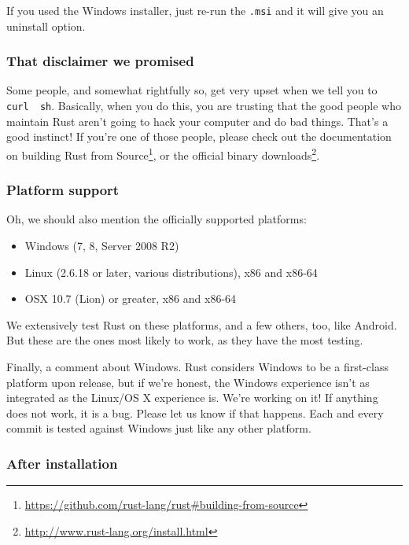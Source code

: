 \documentclass[a4paper,]{book}
\renewcommand{\href}[2]{#2\footnote{\url{#1}}}
\providecommand{\tightlist}{%
  \setlength{\itemsep}{0pt}\setlength{\parskip}{0pt}}
\begin{document}
If you used the Windows installer, just re-run the \texttt{.msi} and it
will give you an uninstall option.

\subsubsection{That disclaimer we
promised}\label{that-disclaimer-we-promised}

Some people, and somewhat rightfully so, get very upset when we tell you
to \texttt{curl\ \textbar{}\ sh}. Basically, when you do this, you are
trusting that the good people who maintain Rust aren't going to hack
your computer and do bad things. That's a good instinct! If you're one
of those people, please check out the documentation on
\href{https://github.com/rust-lang/rust\#building-from-source}{building
Rust from Source}, or \href{http://www.rust-lang.org/install.html}{the
official binary downloads}.

\subsubsection{Platform support}\label{platform-support}

Oh, we should also mention the officially supported platforms:

\begin{itemize}
\tightlist
\item
  Windows (7, 8, Server 2008 R2)
\item
  Linux (2.6.18 or later, various distributions), x86 and x86-64
\item
  OSX 10.7 (Lion) or greater, x86 and x86-64
\end{itemize}

We extensively test Rust on these platforms, and a few others, too, like
Android. But these are the ones most likely to work, as they have the
most testing.

Finally, a comment about Windows. Rust considers Windows to be a
first-class platform upon release, but if we're honest, the Windows
experience isn't as integrated as the Linux/OS X experience is. We're
working on it! If anything does not work, it is a bug. Please let us
know if that happens. Each and every commit is tested against Windows
just like any other platform.

\subsubsection{After installation}\label{after-installation}
\end{document}
